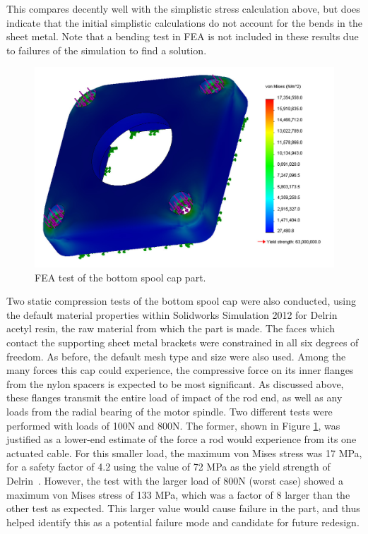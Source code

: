 \documentclass[12pt]{report}
\begin{document}
This compares decently well with the simplistic stress calculation above, but does indicate that the initial simplistic calculations do not account for the bends in the sheet metal.
Note that a bending test in FEA is not included in these results due to failures of the simulation to find a solution.

\begin{figure}
   \centering
   \includegraphics[width=0.4\columnwidth]{img/bottom_spool_cap_compression_test_edited.jpg} 
   \caption{FEA test of the bottom spool cap part.~\cite{sabelhaus2014hardware}}
   \label{bottom_spool_cap_100N}
\end{figure}

Two static compression tests of the bottom spool cap were also conducted, using the default material properties within Solidworks Simulation 2012 for Delrin acetyl resin, the raw material from which the part is made.
The faces which contact the supporting sheet metal brackets were constrained in all six degrees of freedom. %
As before, the default mesh type and size were also used.
Among the many forces this cap could experience, the compressive force on its inner flanges from the nylon spacers is expected to be most significant.
As discussed above, these flanges transmit the entire load of impact of the rod end, as well as any loads from the radial bearing of the motor spindle.
Two different tests were performed with loads of 100N and 800N.
The former, shown in Figure \ref{bottom_spool_cap_100N}, was justified as a lower-end estimate of the force a rod would experience from its one actuated cable.
For this smaller load, the maximum von Mises stress was 17 MPa, for a safety factor of 4.2 using the value of 72 MPa as the yield strength of Delrin~\cite{Delrin2014}.
However, the test with the larger load of 800N (worst case) showed a maximum von Mises stress of 133 MPa, which was a factor of 8 larger than the other test as expected.
This larger value would cause failure in the part, and thus helped identify this as a potential failure mode and candidate for future redesign. \\
\end{document}
